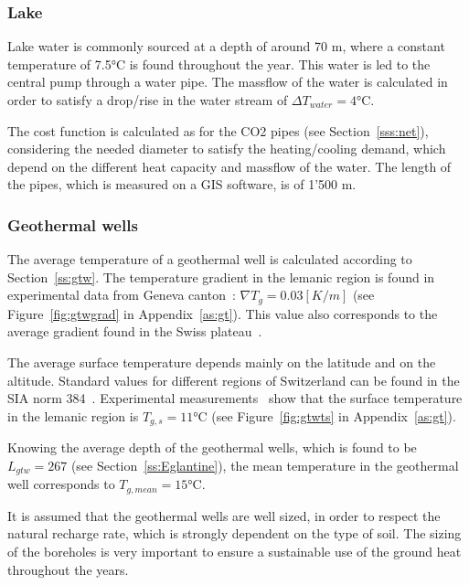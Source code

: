 \documentclass{article}
\begin{document}
\subsubsection{Lake}
Lake water is commonly sourced at a depth of around 70 m, where a constant temperature of 7.5\si{\celsius} is found throughout the year. This water is led to the central pump through a water pipe. The massflow of the water is calculated in order to satisfy a drop/rise in the water stream of $\Delta T_{water}  = 4 \si{\celsius}$.

The cost function is calculated as for the CO2 pipes (see Section~\ref{sss:net}), considering the needed diameter to satisfy the heating/cooling demand, which depend on the different heat capacity and massflow of the water. The length of the pipes, which is measured on a GIS software, is of 1'500 m.


\subsubsection{Geothermal wells}
The average temperature of a geothermal well is calculated according to Section~\ref{ss:gtw}. The temperature gradient in the lemanic region is found in experimental data from Geneva canton~\cite{gadzEvaluationPotentielGeothermique2011}: $\nabla T_{g} = 0.03 [K/m]$ (see Figure~\ref{fig:gtwgrad} in Appendix~\ref{as:gt}).
This value also corresponds to the average gradient found in the Swiss plateau~\cite{siaSIA384Sondes2010}.

The average surface temperature depends mainly on the latitude and on the altitude. Standard values for different regions of Switzerland can be found in the SIA norm 384~\cite{siaSIA384Sondes2010}. Experimental measurements~\cite{gadzEvaluationPotentielGeothermique2011} show that the surface temperature in the lemanic region is $	T_{g,s} = 11 \si{\celsius}$ (see Figure~\ref{fig:gtwts} in Appendix~\ref{as:gt}).

Knowing the average depth of the geothermal wells, which is found to be $L_{gtw} = 267$ (see Section~\ref{ss:Eglantine}), the mean temperature in the geothermal well corresponds to $T_{g, mean} = 15 \si{\celsius}$.

It is assumed that the geothermal wells are well sized, in order to respect the natural recharge rate, which is strongly dependent on the type of soil. The sizing of the boreholes is very important to ensure a sustainable use of the ground heat throughout the years. \\
\end{document}
